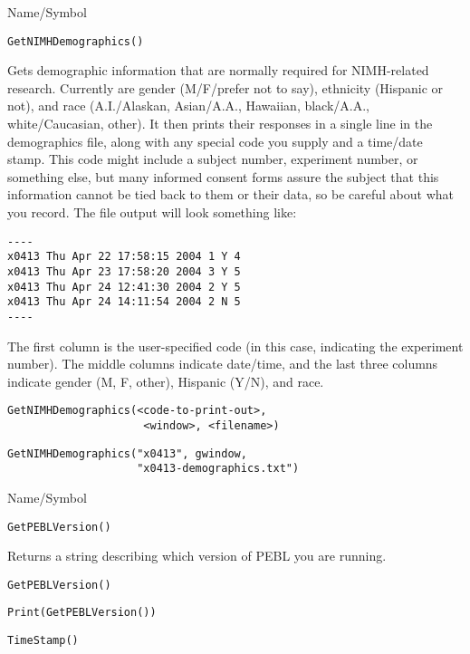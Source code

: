 \begin{desc}{Name/Symbol}
\item[Name/Symbol]	\verb+GetNIMHDemographics()+

\item[Description]	Gets demographic information that are normally required for NIMH-related research.  Currently are gender (M/F/prefer not to say), ethnicity (Hispanic or not), and race (A.I./Alaskan, Asian/A.A., Hawaiian, black/A.A., white/Caucasian, other).  
		It then prints their responses in a single line in the demographics file, along with any special code you supply and a time/date stamp. This code might include a subject number, experiment number, or something else, but many informed consent forms assure the subject that this information cannot be tied back to them or their data, so be careful about what you record. The file output will look something like: 
\begin{verbatim}
---- 
x0413 Thu Apr 22 17:58:15 2004 1 Y 4 
x0413 Thu Apr 23 17:58:20 2004 3 Y 5 
x0413 Thu Apr 24 12:41:30 2004 2 Y 5 
x0413 Thu Apr 24 14:11:54 2004 2 N 5 
---- 
\end{verbatim}


	The first column is the user-specified code (in this 
	case, indicating the experiment number).  The middle columns 
	indicate date/time, and the last three columns indicate 
	gender (M, F, other), Hispanic (Y/N), and race.

\item[Usage]
\begin{verbatim}
GetNIMHDemographics(<code-to-print-out>,
                     <window>, <filename>)
\end{verbatim} 

\item[Example]
\begin{verbatim}
GetNIMHDemographics("x0413", gwindow, 
                    "x0413-demographics.txt")
\end{verbatim}

\item[See Also]	
\end{desc}



\begin{desc}{Name/Symbol}
\item[Name/Symbol]	\verb+GetPEBLVersion()+

\item[Description]	Returns a string describing which version of PEBL you are running.

\item[Usage]
\begin{verbatim}
GetPEBLVersion() 
\end{verbatim}

\item[Example]
\begin{verbatim}
Print(GetPEBLVersion())
\end{verbatim}

\item[See Also]	\verb+TimeStamp()+
\end{desc}


